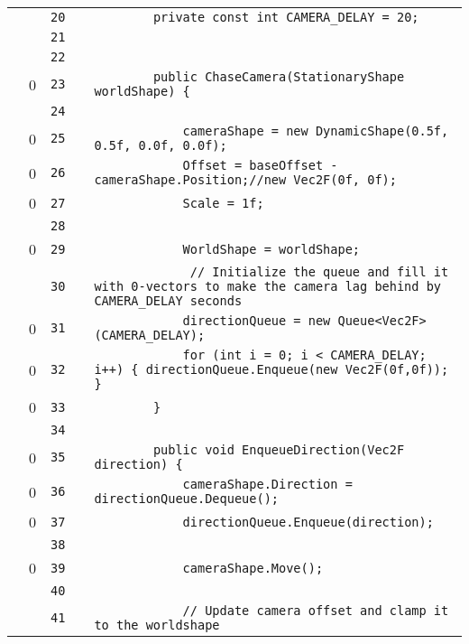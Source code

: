 \documentclass[a4paper,landscape,10pt]{article}
\begin{document}
\begin{longtable}[l]{lrrll}
\cellcolor{gray} &  & \verb~20~ & & \verb~        private const int CAMERA_DELAY = 20;~\\
\cellcolor{gray} &  & \verb~21~ & & \verb~~\\
\cellcolor{gray} &  & \verb~22~ & & \verb~~\\
\cellcolor{red} & 0 & \verb~23~ & & \verb~        public ChaseCamera(StationaryShape worldShape) {~\\
\cellcolor{gray} &  & \verb~24~ & & \verb~~\\
\cellcolor{red} & 0 & \verb~25~ & & \verb~            cameraShape = new DynamicShape(0.5f, 0.5f, 0.0f, 0.0f);~\\
\cellcolor{red} & 0 & \verb~26~ & & \verb~            Offset = baseOffset - cameraShape.Position;//new Vec2F(0f, 0f);~\\
\cellcolor{red} & 0 & \verb~27~ & & \verb~            Scale = 1f;~\\
\cellcolor{gray} &  & \verb~28~ & & \verb~~\\
\cellcolor{red} & 0 & \verb~29~ & & \verb~            WorldShape = worldShape;~\\
\cellcolor{gray} &  & \verb~30~ & & \verb~             // Initialize the queue and fill it with 0-vectors to make the camera lag behind by CAMERA_DELAY seconds~\\
\cellcolor{red} & 0 & \verb~31~ & & \verb~            directionQueue = new Queue<Vec2F>(CAMERA_DELAY);~\\
\cellcolor{red} & 0 & \verb~32~ & & \verb~            for (int i = 0; i < CAMERA_DELAY; i++) { directionQueue.Enqueue(new Vec2F(0f,0f)); }~\\
\cellcolor{red} & 0 & \verb~33~ & & \verb~        }~\\
\cellcolor{gray} &  & \verb~34~ & & \verb~~\\
\cellcolor{red} & 0 & \verb~35~ & & \verb~        public void EnqueueDirection(Vec2F direction) {~\\
\cellcolor{red} & 0 & \verb~36~ & & \verb~            cameraShape.Direction = directionQueue.Dequeue();~\\
\cellcolor{red} & 0 & \verb~37~ & & \verb~            directionQueue.Enqueue(direction);~\\
\cellcolor{gray} &  & \verb~38~ & & \verb~~\\
\cellcolor{red} & 0 & \verb~39~ & & \verb~            cameraShape.Move();~\\
\cellcolor{gray} &  & \verb~40~ & & \verb~~\\
\cellcolor{gray} &  & \verb~41~ & & \verb~            // Update camera offset and clamp it to the worldshape~\\

\end{longtable}
\end{document}
